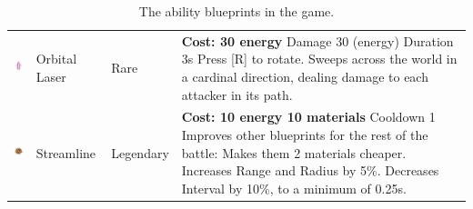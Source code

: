 \begin{table}[H]
\begin{tabular}{m{15mm}m{20mm}lm{}}
        \includegraphics[height=15mm]{img/Icons/Abilities/Orbital Laser.png}   & Orbital Laser   & Rare            &
        \footnotesize{\textbf{Cost: 30 energy} \newline Damage 30 (energy) \newline Duration 3s \newline Press [R] to rotate. \newline Sweeps across the world in a cardinal direction, dealing damage to each attacker in its path.}                                                                                                                                                      \\

        \includegraphics[height=15mm]{img/Icons/Abilities/Streamline.png}      & Streamline      & Legendary       &
        \footnotesize{\textbf{Cost: 10 energy 10 materials} \newline Cooldown 1  \newline Improves other blueprints for the rest of the battle: \newline Makes them 2 materials cheaper. \newline Increases Range and Radius by 5\%. \newline Decreases Interval by 10\%, to a minimum of 0.25s.}                                                                                          \\
        \bottomrule
    \end{tabular}
    \caption{The ability blueprints in the game.}
    \label{tab:abilities}
\end{table}
